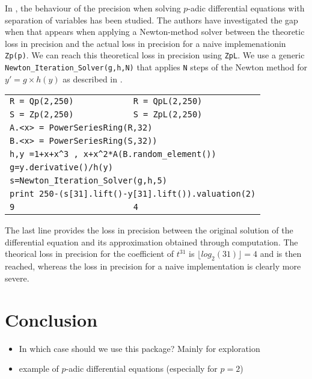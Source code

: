 \documentclass[sigconf]{acmart}
\theoremstyle{definition}
\begin{document}
In \cite{LV16}, the behaviour of the precision when solving
$p$-adic differential equations with separation of 
variables has been studied.
The authors have investigated the gap when that appears
when applying a Newton-method solver between
the theoretic loss in precision and the 
actual loss in precision for a naive implemenationin \verb?Zp(p)?.
We can reach this theoretical loss in precision using \verb?ZpL?.
We use a generic \verb?Newton_Iteration_Solver(g,h,N)?
that applies \verb?N? steps of the Newton method for 
$y'=g \times h(y)$ as described in \citep{LV16}. 

\begin{tabular}{|l|l|}
\verb?R = Qp(2,250)? & \verb?R = QpL(2,250)? \\
\verb?S = Zp(2,250)? & \verb?S = ZpL(2,250)? \\
\multicolumn{2}{|l|}{\tt A.<x> = PowerSeriesRing(R,32) } \\
\multicolumn{2}{|l|}{\tt B.<x> = PowerSeriesRing(S,32)) } \\
\multicolumn{2}{|l|}{\tt h,y =1+x+x\^{}3 , x+x\^{}2*A(B.random\_element()) } \\
\multicolumn{2}{|l|}{\tt g=y.derivative()/h(y) } \\
\multicolumn{2}{|l|}{\tt s=Newton\_Iteration\_Solver(g,h,5)} \\
\multicolumn{2}{|l|}{\tt print 250-(s[31].lift()-y[31].lift()).valuation(2)} \\
\hfill\verb?9? & \hfill\verb?4? \\
\end{tabular}
The last line provides the loss in precision between the
original solution of the differential equation and its approximation
obtained through computation.
The theorical loss in precision for the coefficient of $t^{31}$
is $\lfloor log_2 (31)\rfloor=4$ and is then reached, whereas the
loss in precision for a naive implementation is clearly more severe.


\section{Conclusion}

\begin{itemize}
\item In which case should we use this package? Mainly for exploration
\item example of $p$-adic differential equations (especially for $p=2$)
\end{itemize}
\end{document}
